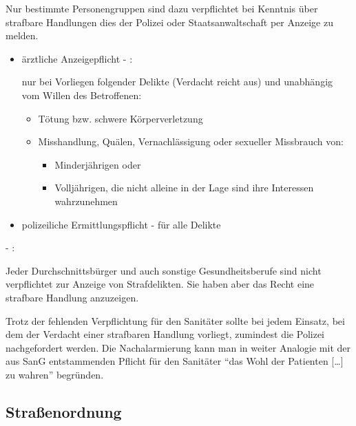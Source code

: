 Nur bestimmte Personengruppen sind dazu verpflichtet bei Kenntnis über
strafbare Handlungen dies der Polizei oder Staatsanwaltschaft per
Anzeige zu melden.

\begin{itemize}
  \item
  ärztliche Anzeigepflicht - :
  
  nur bei Vorliegen folgender Delikte (Verdacht reicht aus) und
  unabhängig vom Willen des Betroffenen:
  \begin{itemize}
    \item
    Tötung bzw. schwere Körperverletzung
    \item
    Misshandlung, Quälen, Vernachlässigung oder sexueller Missbrauch
    von:
    \begin{itemize}
      \item Minderjährigen oder
      \item Volljährigen, die nicht alleine in der Lage sind ihre Interessen
      wahrzunehmen
    \end{itemize}
  \end{itemize}
  \item polizeiliche Ermittlungspflicht - 
  für alle Delikte
\end{itemize}


 - :

Jeder Durchschnittsbürger und auch sonstige Gesundheitsberufe sind
nicht verpflichtet zur Anzeige von Strafdelikten. Sie haben aber das
Recht eine strafbare Handlung anzuzeigen.

Trotz der fehlenden Verpflichtung für den Sanitäter sollte bei jedem
Einsatz, bei dem der Verdacht einer strafbaren Handlung vorliegt,
zumindest die Polizei nachgefordert werden. Die Nachalarmierung kann
man in weiter Analogie mit der aus  SanG
entstammenden Pflicht für den Sanitäter "`das Wohl der
Patienten [{\dots}] zu wahren"' begründen.





\subsection{Straßenordnung}

